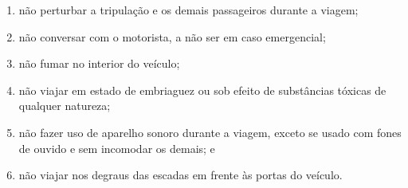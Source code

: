 \begin{enumerate}[resume, label=Art. \arabic*]
\begin{enumerate}[label=\roman*.]
\item não perturbar a tripulação e os demais passageiros durante a viagem;

\item não conversar com o motorista, a não ser em caso emergencial;

\item não fumar no interior do veículo;

\item não viajar em estado de embriaguez ou sob efeito de substâncias tóxicas de qualquer natureza;

\item não fazer uso de aparelho sonoro durante a viagem, exceto se usado com fones de ouvido e sem incomodar os demais; e

\item não viajar nos degraus das escadas em frente às portas do veículo.

\end{enumerate}

\end{enumerate}